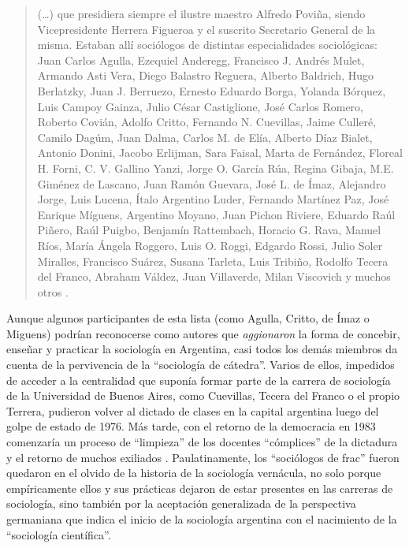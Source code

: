 \begin{quote}
(\dots) que presidiera siempre el ilustre maestro Alfredo Poviña, siendo Vicepresidente Herrera Figueroa y el suscrito Secretario General de la misma. Estaban allí sociólogos de distintas especialidades sociológicas: Juan Carlos Agulla, Ezequiel Anderegg, Francisco J. Andrés Mulet, Armando Asti Vera, Diego Balastro Reguera, Alberto Baldrich, Hugo Berlatzky, Juan J. Berruezo, Ernesto Eduardo Borga, Yolanda Bórquez, Luis Campoy Gainza, Julio César Castiglione, José Carlos Romero, Roberto Covián, Adolfo Critto, Fernando N. Cuevillas, Jaime Culleré, Camilo Dagúm, Juan Dalma, Carlos M. de Elía, Alberto Díaz Bialet, Antonio Donini, Jacobo Erlijman, Sara Faisal, Marta de Fernández, Floreal H. Forni, C. V. Gallino Yanzi, Jorge O. García Rúa, Regina Gibaja, M.E. Giménez de Lascano, Juan Ramón Guevara, José L. de Ímaz, Alejandro Jorge, Luis Lucena, Ítalo Argentino Luder, Fernando Martínez Paz, José Enrique Míguens, Argentino Moyano, Juan Pichon Riviere, Eduardo Raúl Piñero, Raúl Puigbo, Benjamín Rattembach, Horacio G. Rava, Manuel Ríos, María Ángela Roggero, Luis O. Roggi, Edgardo Rossi, Julio Soler Miralles, Francisco Suárez, Susana Tarleta, Luis Tribiño, Rodolfo Tecera del Franco, Abraham Váldez, Juan Villaverde, Milan Viscovich y muchos otros \parencite{1585-DAVID2000}.
\end{quote}

Aunque algunos participantes de esta lista (como Agulla, Critto, de Ímaz o Miguens) podrían reconocerse como autores que \emph{aggionaron} la forma de concebir, enseñar y practicar la sociología en Argentina, casi todos los demás miembros da cuenta de la pervivencia de la \enquote{sociología de cátedra}. Varios de ellos, impedidos de acceder a la centralidad que suponía formar parte de la carrera de sociología de la Universidad de Buenos Aires, como Cuevillas, Tecera del Franco o el propio Terrera, pudieron volver al dictado de clases en la capital argentina luego del golpe de estado de 1976. Más tarde, con el retorno de la democracia en 1983 comenzaría un proceso de \enquote{limpieza} de los docentes \enquote{cómplices} de la dictadura y el retorno de muchos exiliados \parencite{1551-BLOIS2009,1552-BLOIS2019}. Paulatinamente, los \enquote{sociólogos de frac} fueron quedaron en el olvido de la historia de la sociología vernácula, no solo porque empíricamente ellos y sus prácticas dejaron de estar presentes en las carreras de sociología, sino también por la aceptación generalizada de la perspectiva germaniana que indica el inicio de la sociología argentina con el nacimiento de la \enquote{sociología científica}.

